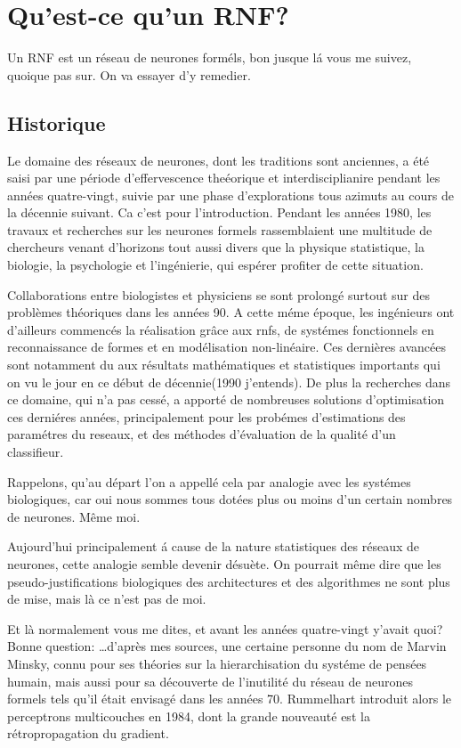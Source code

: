 \documentclass[a4paper,12pt]{report}
\begin{document}
\section{ Qu'est-ce qu'un RNF?}
Un RNF est un r\'eseau de neurones form\'els, bon jusque l\'a vous me
suivez, quoique pas sur. On va essayer d'y remedier.
\subsection{Historique}
Le domaine des r\'eseaux de neurones, dont les traditions sont
anciennes, a \'et\'e saisi par une p\'eriode d'effervescence
the\'eorique et interdisciplianire pendant les ann\'ees quatre-vingt,
suivie par une phase d'explorations tous azimuts au cours de la
d\'ecennie suivant. Ca c'est pour l'introduction.
Pendant les ann\'ees 1980, les travaux et recherches sur les neurones
formels rassemblaient une multitude de chercheurs venant d'horizons
tout aussi divers que la physique statistique, la biologie,
la psychologie et l'ing\'enierie, qui esp\'erer profiter de cette
situation.

Collaborations entre biologistes et physiciens se sont prolong\'e
surtout sur des probl\`emes th\'eoriques dans les ann\'ees 90. A cette
m\'eme \'epoque, les ing\'enieurs ont d'ailleurs commenc\'es la
r\'ealisation gr\^ace aux rnfs, de syst\'emes fonctionnels en
reconnaissance de formes et en mod\'elisation non-lin\'eaire.
Ces derni\`eres avanc\'ees sont notamment du aux r\'esultats
math\'ematiques et statistiques importants qui on vu le jour en ce
d\'ebut de d\'ecennie(1990 j'entends). De plus la
recherches dans ce domaine, qui n'a pas cess\'e, a apport\'e de nombreuses solutions
d'optimisation ces derni\'eres ann\'ees, principalement pour les
prob\'emes d'estimations des param\'etres du reseaux, et des
m\'ethodes d'\'evaluation de la qualit\'e d'un classifieur.

Rappelons, qu'au d\'epart l'on a appell\'e cela par analogie avec les
syst\'emes biologiques, car oui nous sommes tous dot\'ees plus ou
moins d'un certain nombres de neurones. M\^eme moi.

Aujourd'hui principalement \'a cause de la nature statistiques des
r\'eseaux de neurones, cette analogie semble devenir d\'esu\`ete.
On pourrait m\^eme dire que les pseudo-justifications biologiques des
architectures et des algorithmes ne sont plus de mise, mais l\`a ce
n'est pas de moi.

Et l\`a normalement vous me dites, et avant les ann\'ees quatre-vingt
y'avait quoi? Bonne question: \dots d'apr\`es mes sources, une certaine
personne du nom de Marvin Minsky, connu pour ses th\'eories sur la
hierarchisation du syst\'eme de pens\'ees humain, mais aussi pour sa
d\'ecouverte de l'inutilit\'e du r\'eseau de neurones formels tels
qu'il \'etait envisag\'e dans les ann\'ees 70. Rummelhart introduit
alors le perceptrons multicouches en 1984, dont la grande nouveaut\'e
est la r\'etropropagation du gradient.
\end{document}
